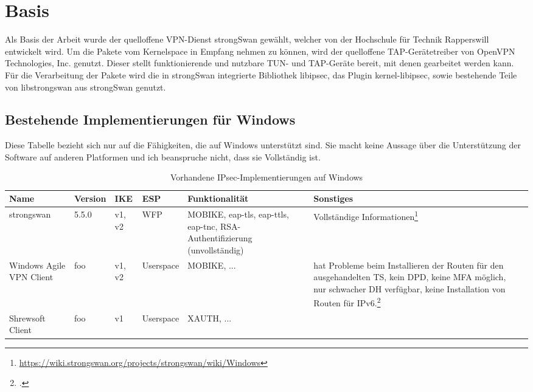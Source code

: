 


\section{Basis}
Als Basis der Arbeit wurde der quelloffene VPN-Dienst strongSwan gewählt,
welcher von der Hochschule für Technik Rapperswill entwickelt wird.
Um die Pakete vom Kernelspace in Empfang nehmen zu können, wird der quelloffene
TAP-Gerätetreiber von OpenVPN Technologies, Inc. genutzt. Dieser stellt funktionierende
und nutzbare TUN- und TAP-Geräte bereit, mit denen gearbeitet werden kann.
Für die Verarbeitung der Pakete wird die in strongSwan integrierte Bibliothek libipsec,
das Plugin kernel-libipsec, sowie bestehende Teile von libstrongswan
aus strongSwan genutzt.

\subsection{Bestehende Implementierungen für Windows}

Diese Tabelle bezieht sich nur auf die Fähigkeiten, die auf Windows unterstützt sind.
Sie macht keine Aussage über die Unterstützung der Software auf anderen Platformen
und ich beanspruche nicht, dass sie Vollständig ist.
\begin{table}[h]
\caption{Vorhandene IPsec-Implementierungen auf Windows }
\begin{tabular*}{\textwidth}{|p{2cm}|p{1cm}|p{1cm}|p{2cm}|p{2cm}|p{4cm}|p{4cm}|}\firsthline
Name & Version & IKE & ESP & Funktionalität & Sonstiges \\ \hline 
strongswan & 5.5.0 & v1, v2 & \ac{WFP} & MOBIKE, eap-tls, eap-ttls, eap-tnc, RSA-Authentifizierung (unvollständig) & Vollständige Informationen\footnote{\url{https://wiki.strongswan.org/projects/strongswan/wiki/Windows}} \\ \hline 
Windows Agile VPN Client & foo & v1, v2 & Userspace & MOBIKE, ... & hat Probleme beim Installieren der Routen für den ausgehandelten \ac{TS}, kein \ac{DPD}, keine \ac{MFA} möglich, nur schwacher \ac{DH} verfügbar, keine Installation von Routen für IPv6.\footcite{_windows7_2016} \\ \hline 
Shrewsoft Client & foo & v1 & Userspace & XAUTH, ... & & \\ \hline
\end{tabular*}
\label{tab:IPsec-Implementierungen}
\end{table}
